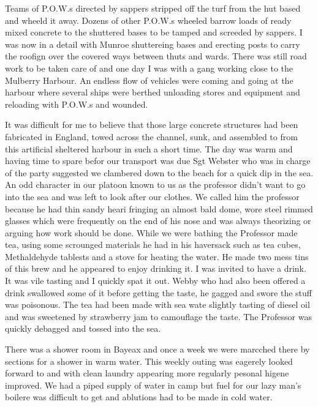Teams of P.O.W.s directed by sappers stripped off the turf from the
hut based and wheeld it away. Dozens of other P.O.W.s wheeled barrow
loads of ready mixed concrete to the shuttered bases to be tamped and
screeded by sappers. I was now in a detail with \lcorporal Munroe
shuttereing bases and erecting posts to carry the roofign over the
covered ways between thuts and wards. There was still road work to be
taken care of and one day I was with a gang working close to the
Mulberry Harbour. An endless flow of vehicles were coming and going at
the harbour where several ships were berthed unloading stores and
equipment and reloading with P.O.W.s and wounded.

It was difficult for me to believe that those large concrete
structures had been fabricated in England, towed across the channel,
sunk, and assembled to from this artificial sheltered harbour in such
a short time. The day was warm and having time to spare befor our
transport was due Sgt Webster who was in charge of the party suggested
we clambered down to the beach for a quick dip in the sea. An odd
character in our platoon known to us as the professor didn't want to
go into the sea and was left to look after our clothes. We called him
the professor because he had thin sandy heari fringing an almost bald
dome, wore steel rimmed glasses which were frequently on the end of
his nose and was always theorizing or arguing how work should be
done. While we were bathing the Professor made tea, using some
scrounged materials he had in his haversack such as tea cubes,
Methaldehyde tablests and a stove for heating the water. He made two
mess tins of this brew and he appeared to enjoy drinking it. I was
invited to have a drink. It was vile tasting and I quickly spat it
out. Webby who had also been offered a drink swallowed some of it
before getting the taste, he gagged and swore the stuff was
poisonous. The tea had been made with sea wate slightly tasting of
diesel oil and was sweetened by strawberry jam to camouflage the
taste. The Professor was quickly debagged and tossed into the sea.

There was a shower room in Bayeax and once a week we were marcched
there by sections for a shower in warm water. This weekly outing was
eagerely looked forward to and with clean laundry appearing more
regularly pesonal higene improved. We had a piped supply of water in
camp but fuel for our lazy man's boilere was difficult to get and
ablutions had to be made in cold water.

